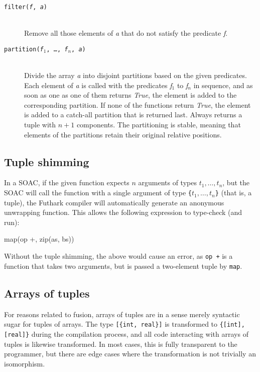 \documentclass[oneside]{memoir}
\begin{document}
\begin{description}
  \item[\texttt{filter(\textit{f}, \textit{a})}]\hfill\\
    Remove all those elements of \textit{a} that do not satisfy the
    predicate \textit{f}.

  \item[\texttt{partition(\textit{f}$_{1}$, \ldots, \textit{f}$_{n}$, \textit{a})}]\hfill\\
    Divide the array \textit{a} into disjoint partitions based on the
    given predicates.  Each element of \textit{a} is called with the
    predicates \textit{f}$_{1}$ to \textit{f}$_{n}$ in sequence, and
    as soon as one as one of them returns \textit{True}, the element
    is added to the corresponding partition.  If none of the functions
    return \textit{True}, the element is added to a catch-all
    partition that is returned last.  Always returns a tuple with
    $n+1$ components.  The partitioning is stable, meaning that
    elements of the partitions retain their original relative
    positions.

\end{description}

\subsection{Tuple shimming}

In a SOAC, if the given function expects $n$ arguments of types
$t_{1}, \ldots, t_{n}$, but the SOAC will call the function with a
single argument of type \texttt{\{$t_{1}, \ldots, t_{n}$\}} (that is,
a tuple), the Futhark compiler will automatically generate an anonymous
unwrapping function.  This allows the following expression to
type-check (and run):

\begin{colorcode}
  map(op +, zip(as, bs))
\end{colorcode}

Without the tuple shimming, the above would cause an error, as
\texttt{op +} is a function that takes two arguments, but is passed a
two-element tuple by \texttt{map}.

\subsection{Arrays of tuples}

For reasons related to fusion, arrays of tuples are in a sense merely
syntactic sugar for tuples of arrays.  The type \texttt{[\{int,
  real\}]} is transformed to \texttt{\{[int], [real]\}} during the
compilation process, and all code interacting with arrays of tuples is
likewise transformed.  In most cases, this is fully transparent to the
programmer, but there are edge cases where the transformation is not
trivially an isomorphism.
\end{document}
